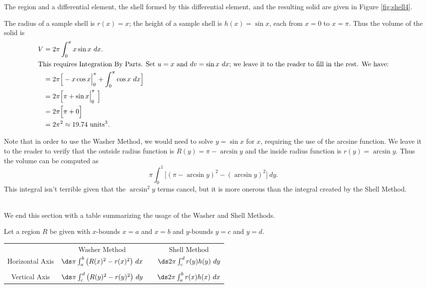 {The region and a differential element, the shell formed by this differential element, and the resulting solid are given in Figure \ref{fig:shell4}.

The radius of a sample shell is $r(x) = x$; the height of a sample shell is $h(x) = \sin x$, each from $x=0$ to $x=\pi$. Thus the volume of the solid is 
\begin{align*}
V &=	2\pi\int_0^{\pi} x\sin x\ dx. \\
\intertext{This requires Integration By Parts. Set $u=x$ and $dv=\sin x\ dx$; we leave it to the reader to fill in the rest. We have:}
	&= 2\pi\Big[-x\cos x\Big|_0^{\pi} +\int_0^{\pi}\cos x\ dx \Big] \\
	&= 2\pi\Big[\pi + \sin x \Big|_0^{\pi}\ \Big] \\
	&= 2\pi\Big[\pi + 0 \Big] \\
	&= 2\pi^2 \approx 19.74 \ \text{units}^3.
	\end{align*}

Note that in order to use the Washer Method, we would need to solve $y=\sin x$ for $x$, requiring the use of the arcsine function. We leave it to the reader to verify that the outside radius function is $R(y) = \pi-\arcsin y$ and the inside radius function is $r(y)=\arcsin y$. Thus the volume can be computed as 
\[
\pi\int_0^1 \Big[ (\pi-\arcsin y)^2-(\arcsin y)^2\Big]\ dy.
\]
This integral isn't terrible given that the $\arcsin^2 y$ terms cancel, but it is more onerous than the integral created by the Shell Method.
}\\



We end this section with a table summarizing the usage of the Washer and Shell Methods.

{Let a region $R$ be given with $x$-bounds $x=a$ and $x=b$ and $y$-bounds $y=c$ and $y=d$.
\vskip 5pt
\begin{tabular}{cccc}
 		& Washer Method & & Shell Method \rule[-10pt]{0pt}{10pt} \\
 \parbox{50pt}{\centering Horizontal Axis}  & $\ds \pi\int_a^b \big(R(x)^2-r(x)^2\big)\ dx$ & & $\ds 2\pi\int_c^d r(y)h(y)\ dy$ \\ \\
 \parbox{40pt}{\centering Vertical Axis} &  $\ds\pi \int_c^d\big(R(y)^2-r(y)^2\big)\ dy$ & & $\ds 2\pi\int_a^b r(x)h(x)\ dx$
 \end{tabular}
 }
 
